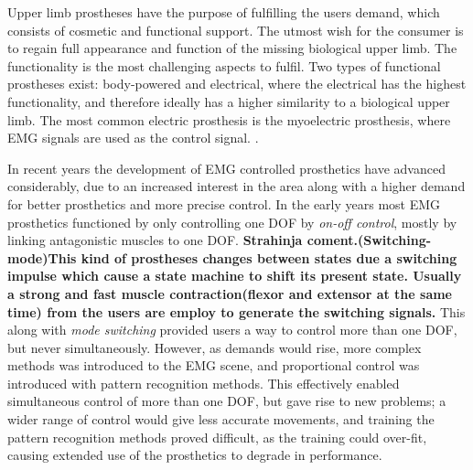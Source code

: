 
Upper limb prostheses have the purpose of fulfilling the users demand, which consists of cosmetic and functional support. The utmost wish for the consumer is to regain full appearance and function of the missing biological upper limb. The functionality is the most challenging aspects to fulfil. Two types of functional prostheses exist: body-powered and electrical, where the electrical has the highest functionality, and therefore ideally has a higher similarity to a biological upper limb. The most common electric prosthesis is the myoelectric prosthesis, where EMG signals are used as the control signal. \cite{jiang2012}. 

In recent years the development of EMG controlled prosthetics have advanced considerably, due to an increased interest in the area along with a higher demand for better prosthetics and more precise control. \cite{Fougner2012} In the early years most EMG prosthetics functioned by only controlling one DOF by \textit{on-off control}, mostly by linking antagonistic muscles to one DOF. \textbf{Strahinja coment.(Switching-mode)This kind of prostheses changes between states due a switching impulse which cause a state machine to shift its present state. Usually a strong and fast muscle contraction(flexor and extensor at the same time) from the users are employ to generate the switching signals.\cite{amsuess2014}}
This along with \textit{mode switching} provided users a way to control more than one DOF, but never simultaneously. However, as demands would rise, more complex methods was introduced to the EMG scene, and proportional control was introduced with pattern recognition methods. This effectively enabled simultaneous control of more than one DOF, but gave rise to new problems; a wider range of control would give less accurate movements, and training the pattern recognition methods proved difficult, as the training could over-fit, causing extended use of the prosthetics to degrade in performance. \cite{Ison2016}

